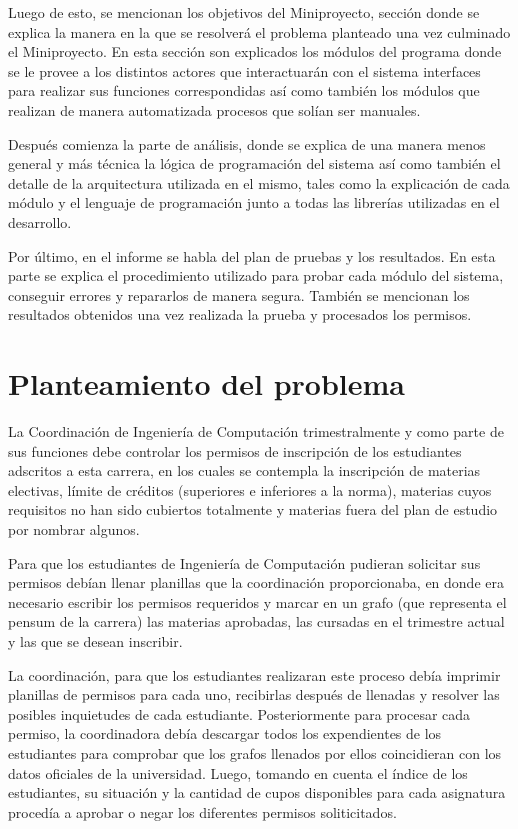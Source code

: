 \documentclass[]{article}
\begin{document}
Luego de esto, se mencionan los objetivos del Miniproyecto, sección
donde se explica la manera en la que se resolverá el problema planteado
una vez culminado el Miniproyecto. En esta sección son explicados los
módulos del programa donde se le provee a los distintos actores que
interactuarán con el sistema interfaces para realizar sus funciones
correspondidas así como también los módulos que realizan de manera
automatizada procesos que solían ser manuales.

Después comienza la parte de análisis, donde se explica de una manera
menos general y más técnica la lógica de programación del sistema así
como también el detalle de la arquitectura utilizada en el mismo, tales
como la explicación de cada módulo y el lenguaje de programación junto a
todas las librerías utilizadas en el desarrollo.

Por último, en el informe se habla del plan de pruebas y los resultados.
En esta parte se explica el procedimiento utilizado para probar cada
módulo del sistema, conseguir errores y repararlos de manera segura.
También se mencionan los resultados obtenidos una vez realizada la
prueba y procesados los permisos.

\section{Planteamiento del problema}\label{planteamiento-del-problema}

La Coordinación de Ingeniería de Computación trimestralmente y como
parte de sus funciones debe controlar los permisos de inscripción de los
estudiantes adscritos a esta carrera, en los cuales se contempla la
inscripción de materias electivas, límite de créditos (superiores e
inferiores a la norma), materias cuyos requisitos no han sido cubiertos
totalmente y materias fuera del plan de estudio por nombrar algunos.

Para que los estudiantes de Ingeniería de Computación pudieran solicitar
sus permisos debían llenar planillas que la coordinación proporcionaba,
en donde era necesario escribir los permisos requeridos y marcar en un
grafo (que representa el pensum de la carrera) las materias aprobadas,
las cursadas en el trimestre actual y las que se desean inscribir.

La coordinación, para que los estudiantes realizaran este proceso debía
imprimir planillas de permisos para cada uno, recibirlas después de
llenadas y resolver las posibles inquietudes de cada estudiante.
Posteriormente para procesar cada permiso, la coordinadora debía
descargar todos los expendientes de los estudiantes para comprobar que
los grafos llenados por ellos coincidieran con los datos oficiales de la
universidad. Luego, tomando en cuenta el índice de los estudiantes, su
situación y la cantidad de cupos disponibles para cada asignatura
procedía a aprobar o negar los diferentes permisos soliticitados.
\end{document}
